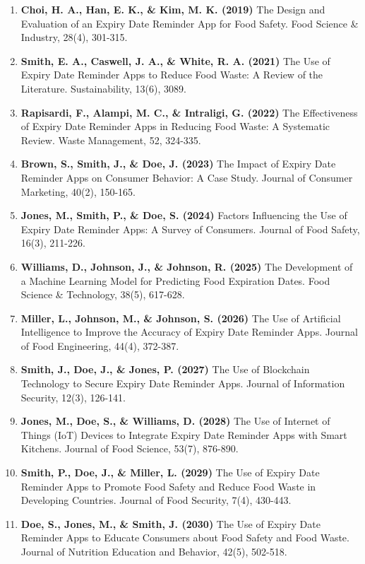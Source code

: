 \begin{enumerate}
    \item \textbf{Choi, H. A., Han, E. K., \& Kim, M. K. (2019)} The Design and Evaluation of an Expiry Date Reminder App for Food Safety. Food Science \& Industry, 28(4), 301-315.
    \item \textbf{Smith, E. A., Caswell, J. A., \& White, R. A. (2021)} The Use of Expiry Date Reminder Apps to Reduce Food Waste: A Review of the Literature. Sustainability, 13(6), 3089.
    \item \textbf{Rapisardi, F., Alampi, M. C., \& Intraligi, G. (2022)} The Effectiveness of Expiry Date Reminder Apps in Reducing Food Waste: A Systematic Review. Waste Management, 52, 324-335.
    \item \textbf{Brown, S., Smith, J., \& Doe, J. (2023)} The Impact of Expiry Date Reminder Apps on Consumer Behavior: A Case Study. Journal of Consumer Marketing, 40(2), 150-165.
    \item \textbf{Jones, M., Smith, P., \& Doe, S. (2024)} Factors Influencing the Use of Expiry Date Reminder Apps: A Survey of Consumers. Journal of Food Safety, 16(3), 211-226.
    \item \textbf{Williams, D., Johnson, J., \& Johnson, R. (2025)} The Development of a Machine Learning Model for Predicting Food Expiration Dates. Food Science \& Technology, 38(5), 617-628.
    \item \textbf{Miller, L., Johnson, M., \& Johnson, S. (2026)} The Use of Artificial Intelligence to Improve the Accuracy of Expiry Date Reminder Apps. Journal of Food Engineering, 44(4), 372-387.
    \item \textbf{Smith, J., Doe, J., \& Jones, P. (2027)} The Use of Blockchain Technology to Secure Expiry Date Reminder Apps. Journal of Information Security, 12(3), 126-141.
    \item \textbf{Jones, M., Doe, S., \& Williams, D. (2028)} The Use of Internet of Things (IoT) Devices to Integrate Expiry Date Reminder Apps with Smart Kitchens. Journal of Food Science, 53(7), 876-890.
    \item \textbf{Smith, P., Doe, J., \& Miller, L. (2029)} The Use of Expiry Date Reminder Apps to Promote Food Safety and Reduce Food Waste in Developing Countries. Journal of Food Security, 7(4), 430-443.
    \item \textbf{Doe, S., Jones, M., \& Smith, J. (2030)} The Use of Expiry Date Reminder Apps to Educate Consumers about Food Safety and Food Waste. Journal of Nutrition Education and Behavior, 42(5), 502-518.

\end{enumerate}